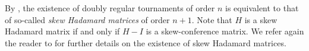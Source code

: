 \documentclass[11pt]{article}
\newtheorem{example}[theorem]{Example}
\newtheorem{remark}[theorem]{Remark}
\begin{document}
By \cite[Theorem 2]{RB72}, the existence of doubly regular tournaments of order $n$ is equivalent to that of so-called \textit{skew Hadamard matrices} of order $n+1$.
Note that $H$ is a skew Hadamard matrix if and only if $H-I$ is a skew-conference matrix.   
We refer again the reader to \cite[Section 9.3.1]{SY} for further details on the existence of skew Hadamard matrices.




\end{document}
